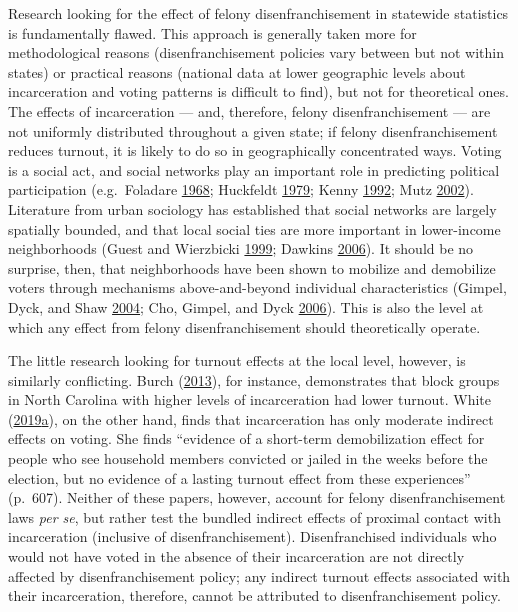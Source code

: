 \documentclass[
  12pt,
]{article}
\begin{document}
Research looking for the effect of felony disenfranchisement in statewide statistics is fundamentally flawed. This approach is generally taken more for methodological reasons (disenfranchisement policies vary between but not within states) or practical reasons (national data at lower geographic levels about incarceration and voting patterns is difficult to find), but not for theoretical ones. The effects of incarceration --- and, therefore, felony disenfranchisement --- are not uniformly distributed throughout a given state; if felony disenfranchisement reduces turnout, it is likely to do so in geographically concentrated ways. Voting is a social act, and social networks play an important role in predicting political participation (e.g.~Foladare \protect\hyperlink{ref-Foladare1968}{1968}; Huckfeldt \protect\hyperlink{ref-Huckfeldt1979}{1979}; Kenny \protect\hyperlink{ref-Kenny1992}{1992}; Mutz \protect\hyperlink{ref-Mutz2002}{2002}). Literature from urban sociology has established that social networks are largely spatially bounded, and that local social ties are more important in lower-income neighborhoods (Guest and Wierzbicki \protect\hyperlink{ref-Guest1999}{1999}; Dawkins \protect\hyperlink{ref-Dawkins2006}{2006}). It should be no surprise, then, that neighborhoods have been shown to mobilize and demobilize voters through mechanisms above-and-beyond individual characteristics (Gimpel, Dyck, and Shaw \protect\hyperlink{ref-Gimpel2004}{2004}; Cho, Gimpel, and Dyck \protect\hyperlink{ref-Cho2006}{2006}). This is also the level at which any effect from felony disenfranchisement should theoretically operate.

The little research looking for turnout effects at the local level, however, is similarly conflicting. Burch (\protect\hyperlink{ref-Burch2013}{2013}), for instance, demonstrates that block groups in North Carolina with higher levels of incarceration had lower turnout. White (\protect\hyperlink{ref-White2019a}{2019}\protect\hyperlink{ref-White2019a}{a}), on the other hand, finds that incarceration has only moderate indirect effects on voting. She finds ``evidence of a short-term demobilization effect for people who see household members convicted or jailed in the weeks before the election, but no evidence of a lasting turnout effect from these experiences'' (p.~607). Neither of these papers, however, account for felony disenfranchisement laws \emph{per se}, but rather test the bundled indirect effects of proximal contact with incarceration (inclusive of disenfranchisement). Disenfranchised individuals who would not have voted in the absence of their incarceration are not directly affected by disenfranchisement policy; any indirect turnout effects associated with their incarceration, therefore, cannot be attributed to disenfranchisement policy.
\end{document}
